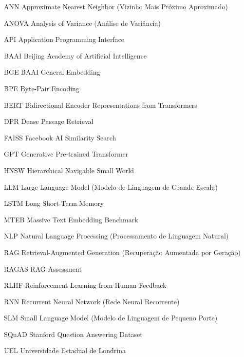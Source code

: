 \documentclass[
	12pt,				%
	openright,			%
	oneside,			%
	a4paper,			%
	tccpreliminar,		%
	]{ABNT-DC-UEL}
\begin{document}
\begin{siglas}
  \item[ANN] Approximate Nearest Neighbor (Vizinho Mais Próximo Aproximado)
  \item[ANOVA] Analysis of Variance (Análise de Variância)
  \item[API] Application Programming Interface
  \item[BAAI] Beijing Academy of Artificial Intelligence
  \item[BGE] BAAI General Embedding
  \item[BPE] Byte-Pair Encoding
  \item[BERT] Bidirectional Encoder Representations from Transformers
  \item[DPR] Dense Passage Retrieval
  \item[FAISS] Facebook AI Similarity Search
  \item[GPT] Generative Pre-trained Transformer
  \item[HNSW] Hierarchical Navigable Small World
  \item[LLM] Large Language Model (Modelo de Linguagem de Grande Escala)
  \item[LSTM] Long Short-Term Memory
  \item[MTEB] Massive Text Embedding Benchmark
  \item[NLP] Natural Language Processing (Processamento de Linguagem Natural)
  \item[RAG] Retrieval-Augmented Generation (Recuperação Aumentada por Geração)
  \item[RAGAS] RAG Assessment
  \item[RLHF] Reinforcement Learning from Human Feedback
  \item[RNN] Recurrent Neural Network (Rede Neural Recorrente)
  \item[SLM] Small Language Model (Modelo de Linguagem de Pequeno Porte)
  \item[SQuAD] Stanford Question Answering Dataset
  \item[UEL] Universidade Estadual de Londrina
\end{siglas}
\end{document}
